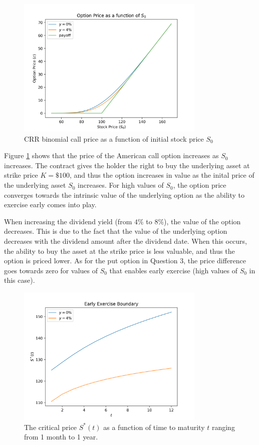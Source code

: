\documentclass{article}
\begin{document}
\begin{figure}[H]
	\centering
	\includegraphics[width=90mm]{images/q4_function_of_S0.png}
	\caption{CRR binomial call price as a function of initial stock price $S_0$}
	\label{q4S0}
\end{figure}

Figure \ref{q4S0} shows that the price of the American call option increases as $S_0$ increases. The contract gives the holder the right to buy the underlying asset at strike price $K=\$100$, and thus the option increases in value as the inital price of the underlying asset $S_0$ increases. For high values of $S_0$, the option price converges towards the intrinsic value of the underlying option as the ability to exercise early comes into play.

When increasing the dividend yield (from $4\%$ to $8\%$), the value of the option decreases. This is due to the fact that the value of the underlying option decreases with the dividend amount after the dividend date. When this occurs, the ability to buy the asset at the strike price is less valuable, and thus the option is priced lower. As for the put option in Question 3, the price difference goes towards zero for values of $S_0$ that enables early exercise (high values of $S_0$ in this case).

\begin{figure}[H]
	\centering
	\includegraphics[width=90mm]{images/q4_critical.png}
	\caption{The critical price $S^*(t)$ as a function of time to maturity $t$ ranging from 1 month to 1 year.}
	\label{q4Crit}
\end{figure}
\end{document}
